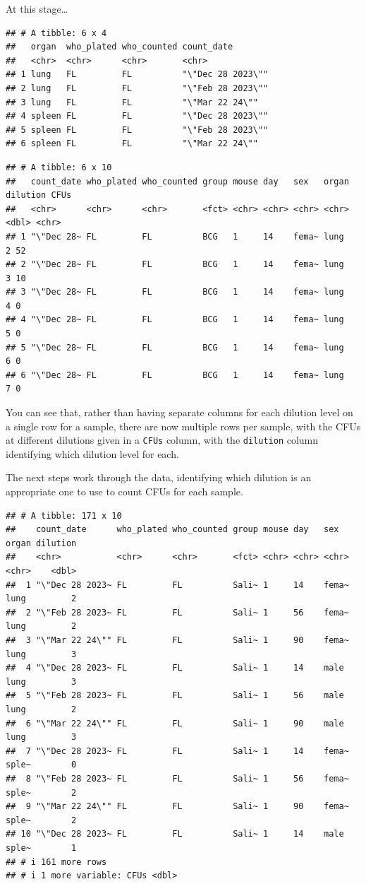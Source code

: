 \documentclass[
]{book}
\begin{document}
At this stage\ldots{}

\begin{verbatim}
## # A tibble: 6 x 4
##   organ  who_plated who_counted count_date       
##   <chr>  <chr>      <chr>       <chr>            
## 1 lung   FL         FL          "\"Dec 28 2023\""
## 2 lung   FL         FL          "\"Feb 28 2023\""
## 3 lung   FL         FL          "\"Mar 22 24\""  
## 4 spleen FL         FL          "\"Dec 28 2023\""
## 5 spleen FL         FL          "\"Feb 28 2023\""
## 6 spleen FL         FL          "\"Mar 22 24\""
\end{verbatim}

\begin{verbatim}
## # A tibble: 6 x 10
##   count_date who_plated who_counted group mouse day   sex   organ dilution CFUs 
##   <chr>      <chr>      <chr>       <fct> <chr> <chr> <chr> <chr>    <dbl> <chr>
## 1 "\"Dec 28~ FL         FL          BCG   1     14    fema~ lung         2 52   
## 2 "\"Dec 28~ FL         FL          BCG   1     14    fema~ lung         3 10   
## 3 "\"Dec 28~ FL         FL          BCG   1     14    fema~ lung         4 0    
## 4 "\"Dec 28~ FL         FL          BCG   1     14    fema~ lung         5 0    
## 5 "\"Dec 28~ FL         FL          BCG   1     14    fema~ lung         6 0    
## 6 "\"Dec 28~ FL         FL          BCG   1     14    fema~ lung         7 0
\end{verbatim}

You can see that, rather than having separate columns for each dilution level
on a single row for a sample, there are now multiple rows per sample, with the
CFUs at different dilutions given in a \texttt{CFUs} column, with the \texttt{dilution} column
identifying which dilution level for each.

The next steps work through the data, identifying which dilution is an
appropriate one to use to count CFUs for each sample.

\begin{verbatim}
## # A tibble: 171 x 10
##    count_date      who_plated who_counted group mouse day   sex   organ dilution
##    <chr>           <chr>      <chr>       <fct> <chr> <chr> <chr> <chr>    <dbl>
##  1 "\"Dec 28 2023~ FL         FL          Sali~ 1     14    fema~ lung         2
##  2 "\"Feb 28 2023~ FL         FL          Sali~ 1     56    fema~ lung         2
##  3 "\"Mar 22 24\"" FL         FL          Sali~ 1     90    fema~ lung         3
##  4 "\"Dec 28 2023~ FL         FL          Sali~ 1     14    male  lung         3
##  5 "\"Feb 28 2023~ FL         FL          Sali~ 1     56    male  lung         2
##  6 "\"Mar 22 24\"" FL         FL          Sali~ 1     90    male  lung         3
##  7 "\"Dec 28 2023~ FL         FL          Sali~ 1     14    fema~ sple~        0
##  8 "\"Feb 28 2023~ FL         FL          Sali~ 1     56    fema~ sple~        2
##  9 "\"Mar 22 24\"" FL         FL          Sali~ 1     90    fema~ sple~        2
## 10 "\"Dec 28 2023~ FL         FL          Sali~ 1     14    male  sple~        1
## # i 161 more rows
## # i 1 more variable: CFUs <dbl>
\end{verbatim}
\end{document}
